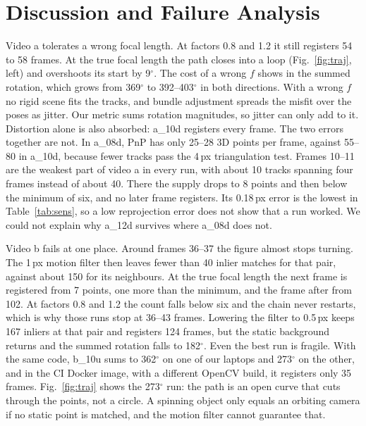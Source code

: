 \documentclass[conference]{assets/latex/IEEEtran}
\begin{document}
\section{Discussion and Failure Analysis}
Video a tolerates a wrong focal length. At factors 0.8 and 1.2 it still
registers 54 to 58 frames. At the true focal length the path closes into a
loop (Fig.~\ref{fig:traj}, left) and overshoots its start by 9$^\circ$.
The cost of a wrong $f$ shows in the summed rotation, which grows from 369$^\circ$ to
392--403$^\circ$ in both directions. With a wrong $f$ no rigid scene fits the
tracks, and bundle adjustment spreads the misfit over the poses as jitter. Our
metric sums rotation magnitudes, so jitter can only add to it. Distortion alone
is also absorbed: a\_10d registers every frame. The two errors together are not.
In a\_08d, PnP has only 25--28 3D points per frame, against 55--80 in a\_10d,
because fewer tracks pass the 4\,px triangulation test. Frames 10--11 are the
weakest part of video a in every run, with about 10 tracks spanning four frames
instead of about 40. There the supply drops to 8 points and then below the
minimum of six, and no later frame registers. Its 0.18\,px error is the lowest
in Table~\ref{tab:sens}, so a low reprojection error does not show that a run
worked. We could not explain why a\_12d survives where a\_08d does not.

Video b fails at one place. Around frames 36--37 the figure almost stops
turning. The 1\,px motion filter then leaves fewer than 40 inlier matches for
that pair, against about 150 for its neighbours. At the true focal length the
next frame is registered from 7 points, one more than the minimum, and the
frame after from 102. At factors 0.8 and 1.2 the count falls below six and the
chain never restarts, which is why those runs stop at 36--43 frames. Lowering
the filter to 0.5\,px keeps 167 inliers at that pair and registers 124 frames,
but the static background returns and the summed rotation falls to
182$^\circ$. Even the best run is fragile. With the same code, b\_10u sums to
362$^\circ$ on one of our laptops and 273$^\circ$ on the other, and in the CI
Docker image, with a different OpenCV build, it registers only 35 frames.
Fig.~\ref{fig:traj} shows the 273$^\circ$ run: the path is an open curve that
cuts through the points, not a circle. A spinning object only equals an
orbiting camera if no static point is matched, and the motion filter cannot
guarantee that.
\end{document}
